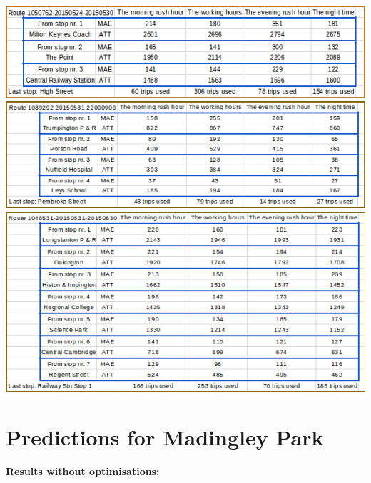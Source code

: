 \documentclass[12pt,a4paper,oneside,openright]{report}
\begin{document}
\includegraphics[width=\textwidth]{figs/table_of_1050762.png}
\includegraphics[width=\textwidth]{figs/table_of_1039292.png}
\includegraphics[width=\textwidth]{figs/table_of_1046531.png}

\newpage

\section{Predictions for Madingley Park}

\label{B2}

\textbf{Results without optimisations:}
\end{document}
